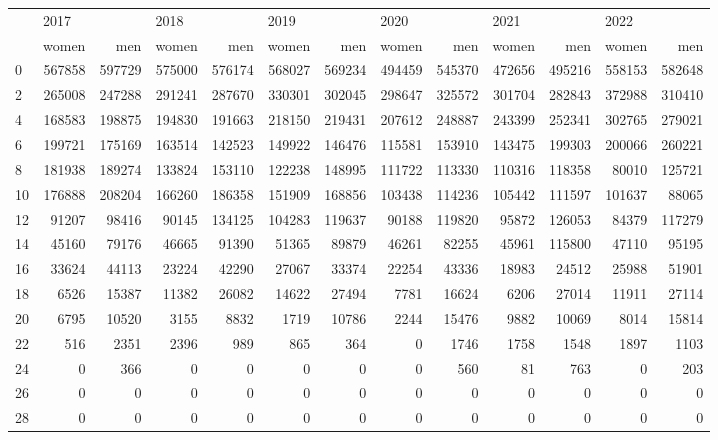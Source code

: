 \begin{tabular}{lrrrrrrrrrrrr}
\toprule
{} & \multicolumn{2}{l}{2017} & \multicolumn{2}{l}{2018} & \multicolumn{2}{l}{2019} & \multicolumn{2}{l}{2020} & \multicolumn{2}{l}{2021} & \multicolumn{2}{l}{2022} \\
{} &   women &     men &   women &     men &   women &     men &   women &     men &   women &     men &   women &     men \\
\midrule
0  &  567858 &  597729 &  575000 &  576174 &  568027 &  569234 &  494459 &  545370 &  472656 &  495216 &  558153 &  582648 \\
2  &  265008 &  247288 &  291241 &  287670 &  330301 &  302045 &  298647 &  325572 &  301704 &  282843 &  372988 &  310410 \\
4  &  168583 &  198875 &  194830 &  191663 &  218150 &  219431 &  207612 &  248887 &  243399 &  252341 &  302765 &  279021 \\
6  &  199721 &  175169 &  163514 &  142523 &  149922 &  146476 &  115581 &  153910 &  143475 &  199303 &  200066 &  260221 \\
8  &  181938 &  189274 &  133824 &  153110 &  122238 &  148995 &  111722 &  113330 &  110316 &  118358 &   80010 &  125721 \\
10 &  176888 &  208204 &  166260 &  186358 &  151909 &  168856 &  103438 &  114236 &  105442 &  111597 &  101637 &   88065 \\
12 &   91207 &   98416 &   90145 &  134125 &  104283 &  119637 &   90188 &  119820 &   95872 &  126053 &   84379 &  117279 \\
14 &   45160 &   79176 &   46665 &   91390 &   51365 &   89879 &   46261 &   82255 &   45961 &  115800 &   47110 &   95195 \\
16 &   33624 &   44113 &   23224 &   42290 &   27067 &   33374 &   22254 &   43336 &   18983 &   24512 &   25988 &   51901 \\
18 &    6526 &   15387 &   11382 &   26082 &   14622 &   27494 &    7781 &   16624 &    6206 &   27014 &   11911 &   27114 \\
20 &    6795 &   10520 &    3155 &    8832 &    1719 &   10786 &    2244 &   15476 &    9882 &   10069 &    8014 &   15814 \\
22 &     516 &    2351 &    2396 &     989 &     865 &     364 &       0 &    1746 &    1758 &    1548 &    1897 &    1103 \\
24 &       0 &     366 &       0 &       0 &       0 &       0 &       0 &     560 &      81 &     763 &       0 &     203 \\
26 &       0 &       0 &       0 &       0 &       0 &       0 &       0 &       0 &       0 &       0 &       0 &       0 \\
28 &       0 &       0 &       0 &       0 &       0 &       0 &       0 &       0 &       0 &       0 &       0 &       0 \\
\bottomrule
\end{tabular}
